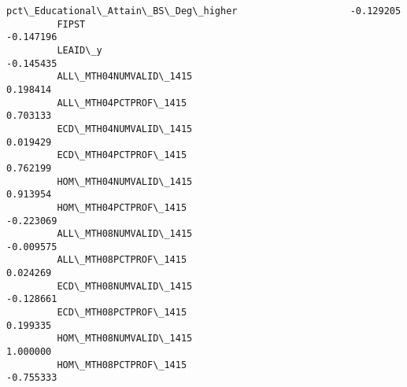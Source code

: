 \documentclass[11pt]{article}
\begin{document}
\begin{Verbatim}[commandchars=\\\{\}]
         pct\_Educational\_Attain\_BS\_Deg\_higher                    -0.129205   
         FIPST                                                   -0.147196   
         LEAID\_y                                                 -0.145435   
         ALL\_MTH04NUMVALID\_1415                                   0.198414   
         ALL\_MTH04PCTPROF\_1415                                    0.703133   
         ECD\_MTH04NUMVALID\_1415                                   0.019429   
         ECD\_MTH04PCTPROF\_1415                                    0.762199   
         HOM\_MTH04NUMVALID\_1415                                   0.913954   
         HOM\_MTH04PCTPROF\_1415                                   -0.223069   
         ALL\_MTH08NUMVALID\_1415                                  -0.009575   
         ALL\_MTH08PCTPROF\_1415                                    0.024269   
         ECD\_MTH08NUMVALID\_1415                                  -0.128661   
         ECD\_MTH08PCTPROF\_1415                                    0.199335   
         HOM\_MTH08NUMVALID\_1415                                   1.000000   
         HOM\_MTH08PCTPROF\_1415                                   -0.755333   
         

\end{Verbatim}
\end{document}
